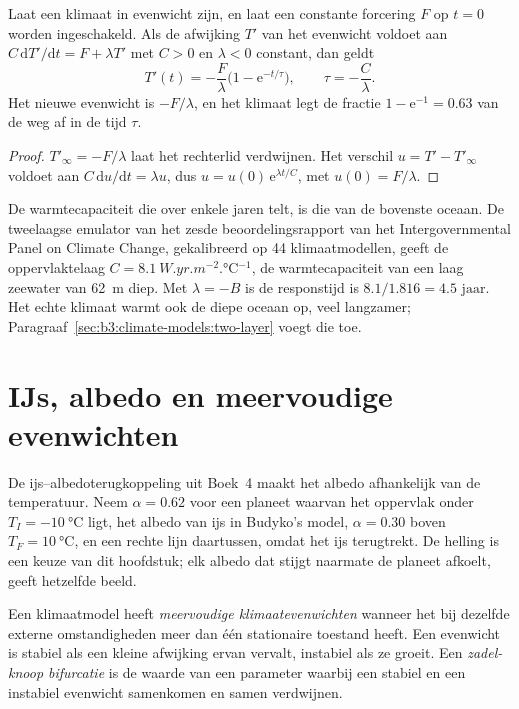\begin{theorem}\label{thm:b3:climate-models:response}
Laat een klimaat in evenwicht zijn, en laat een constante forcering $F$
op $t = 0$ worden ingeschakeld. Als de afwijking $T'$ van het evenwicht voldoet aan $C\,\mathrm
dT'/\mathrm dt = F + \lambda T'$ met $C > 0$ en $\lambda < 0$ constant,
dan geldt
\[
T'(t) = -\frac{F}{\lambda}\Big(1 - \mathrm e^{-t/\tau}\Big), \qquad
\tau = -\frac{C}{\lambda} .
\]
Het nieuwe evenwicht is $-F/\lambda$, en het klimaat legt de fractie $1
- \mathrm e^{-1} = \num{0.63}$ van de weg af in de tijd $\tau$.
\end{theorem}

\begin{proof}
$T'_\infty = -F/\lambda$ laat het rechterlid verdwijnen. Het verschil
$u = T' - T'_\infty$ voldoet aan $C\,\mathrm du/\mathrm dt = \lambda u$, dus $u =
u(0)\,\mathrm e^{\lambda t/C}$, met $u(0) = F/\lambda$.
\end{proof}

De warmtecapaciteit die over enkele jaren telt, is die van de bovenste oceaan.
De tweelaagse emulator van het zesde beoordelingsrapport van het
Intergovernmental Panel on Climate Change, gekalibreerd op 44 klimaatmodellen,
geeft de oppervlaktelaag $C = \qty{8.1}{W.yr.m^{-2}.\celsius^{-1}}$, de
warmtecapaciteit van een laag zeewater van \qty{62}{m} diep. Met $\lambda = -B$ is de
responstijd is $8.1/1.816 = \num{4.5}\text{ jaar}$. Het echte klimaat warmt
ook de diepe oceaan op, veel langzamer; Paragraaf~\ref{sec:b3:climate-models:two-layer}
voegt die toe.

\section{IJs, albedo en meervoudige evenwichten}\label{sec:b3:climate-models:multiple}

De ijs--albedoterugkoppeling uit Boek~4 maakt het albedo afhankelijk van
de temperatuur. Neem $\alpha = 0.62$ voor een planeet waarvan het oppervlak onder
$T_I = \qty{-10}{\celsius}$ ligt, het albedo van ijs in Budyko's model, $\alpha
= 0.30$ boven $T_F = \qty{+10}{\celsius}$, en een rechte lijn daartussen, omdat
het ijs terugtrekt. De helling is een keuze van dit hoofdstuk; elk albedo dat
stijgt naarmate de planeet afkoelt, geeft hetzelfde beeld.

\begin{definition}\label{def:b3:climate-models:multiple-equilibria}
Een klimaatmodel heeft \emph{meervoudige klimaatevenwichten}
wanneer het bij dezelfde externe omstandigheden
meer dan één stationaire toestand heeft. Een evenwicht is stabiel als een kleine afwijking ervan
vervalt, instabiel als ze groeit. Een \emph{zadel-knoop
bifurcatie} is de waarde van een parameter waarbij
een stabiel en een instabiel evenwicht samenkomen en samen verdwijnen.
\end{definition}

